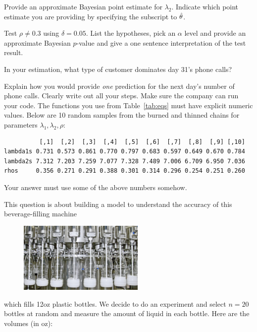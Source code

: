\documentclass[12pt]{article}
\begin{document}
 Provide an approximate Bayesian point estimate for $\lambda_2$. Indicate which point estimate you are providing by specifying the subscript to $\hat{\theta}$. 

 Test $\rho \neq 0.3$ using $\delta = 0.05$. List the hypotheses, pick an $\alpha$ level and provide an approximate Bayesian $p$-value and give a one sentence interpretation of the test result. 

 In your estimation, what type of customer dominates day 31's phone calls? 




 Explain how you would provide \emph{one} prediction for the next day's number of phone calls. Clearly write out all your steps. Make sure the company can run your code. The functions you use from Table~\ref{tab:eqs} must have explicit numeric values.  Below are 10 random samples from the burned and thinned chains for parameters $\lambda_1, \lambda_2, \rho$:

 
\begin{verbatim}
          [,1]  [,2]  [,3]  [,4]  [,5]  [,6]  [,7]  [,8]  [,9] [,10]
lambda1s 0.731 0.573 0.861 0.770 0.797 0.683 0.597 0.649 0.670 0.784
lambda2s 7.312 7.203 7.259 7.077 7.328 7.489 7.006 6.709 6.950 7.036
rhos     0.356 0.271 0.291 0.388 0.301 0.314 0.296 0.254 0.251 0.260
\end{verbatim}

Your answer must use some of the above numbers somehow.


\eenum

\problem This question is about building a model to understand the accuracy of this beverage-filling machine

\begin{figure}[htp]
\centering
\includegraphics[width=2.4in]{milk_filling.jpg}
\end{figure}

\noindent which fills 12oz plastic bottles. We decide to do an experiment and select $n = 20$ bottles at random and measure the amount of liquid in each bottle. Here are the volumes (in oz):
\end{document}
